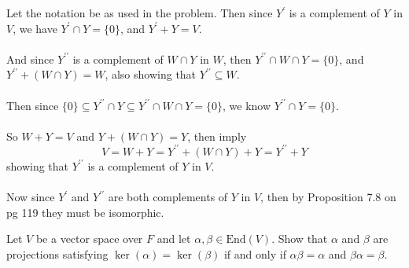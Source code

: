 \documentclass{article}
\begin{document}
\begin{solution}
Let the notation be as used in the problem. Then since $Y^{\prime}$ is a complement of $Y$ in $V$, we have $Y^{\prime} \cap Y = \{0\}$, and $Y^{\prime} + Y = V$.

\paragraph{}
And since $Y^{\prime\prime}$ is a complement of $W\cap Y$ in $W$, then $Y^{\prime\prime} \cap W\cap Y = \{0\}$, and $Y^{\prime\prime} + (W\cap Y) = W$, also showing that $Y^{\prime\prime} \subseteq W$.

\paragraph{}
Then since $\{ 0 \} \subseteq Y^{\prime\prime} \cap Y \subseteq Y^{\prime\prime} \cap W\cap Y = \{ 0 \}$, we know $Y^{\prime\prime} \cap Y = \{ 0 \}$.

\paragraph{}
So $W+Y=V$ and $Y+(W\cap Y)=Y$, then imply
\[ V = W+Y = Y^{\prime\prime} + (W\cap Y) + Y = Y^{\prime\prime} + Y \]
showing that $Y^{\prime\prime}$ is a complement of $Y$ in $V$.

\paragraph{}
Now since $Y^{\prime}$ and $Y^{\prime\prime}$ are both complements of $Y$ in $V$, then by Proposition 7.8 on pg 119 they must be isomorphic.
\end{solution}

\setcounter{problem}{386}
\begin{problem}
Let $V$ be a vector space over $F$ and let $\alpha
,\beta\in\text{End}(V)$. Show that $\alpha$ and $\beta$ are projections satisfying $\ker(\alpha) = \ker(\beta)$ if and only if $\alpha\beta = \alpha$ and $\beta\alpha = \beta$.
\end{problem}
\end{document}
